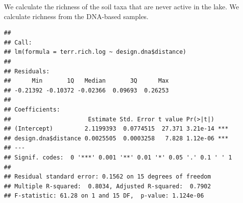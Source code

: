 \documentclass[]{article}
\newenvironment{Shaded}{\begin{snugshade}}{\end{snugshade}}
\newcommand{\KeywordTok}[1]{\textcolor[rgb]{0.13,0.29,0.53}{\textbf{#1}}}
\newcommand{\DecValTok}[1]{\textcolor[rgb]{0.00,0.00,0.81}{#1}}
\newcommand{\StringTok}[1]{\textcolor[rgb]{0.31,0.60,0.02}{#1}}
\newcommand{\CommentTok}[1]{\textcolor[rgb]{0.56,0.35,0.01}{\textit{#1}}}
\newcommand{\OperatorTok}[1]{\textcolor[rgb]{0.81,0.36,0.00}{\textbf{#1}}}
\newcommand{\NormalTok}[1]{#1}
\begin{document}
We calculate the richness of the soil taxa that are never active in the
lake. We calculate richness from the DNA-based samples.

\begin{Shaded}
\end{Shaded}

\begin{verbatim}
## 
## Call:
## lm(formula = terr.rich.log ~ design.dna$distance)
## 
## Residuals:
##      Min       1Q   Median       3Q      Max 
## -0.21392 -0.10372 -0.02366  0.09693  0.26253 
## 
## Coefficients:
##                      Estimate Std. Error t value Pr(>|t|)    
## (Intercept)         2.1199393  0.0774515  27.371 3.21e-14 ***
## design.dna$distance 0.0025505  0.0003258   7.828 1.12e-06 ***
## ---
## Signif. codes:  0 '***' 0.001 '**' 0.01 '*' 0.05 '.' 0.1 ' ' 1
## 
## Residual standard error: 0.1562 on 15 degrees of freedom
## Multiple R-squared:  0.8034, Adjusted R-squared:  0.7902 
## F-statistic: 61.28 on 1 and 15 DF,  p-value: 1.124e-06
\end{verbatim}

\begin{Shaded}
\end{Shaded}
\end{document}
